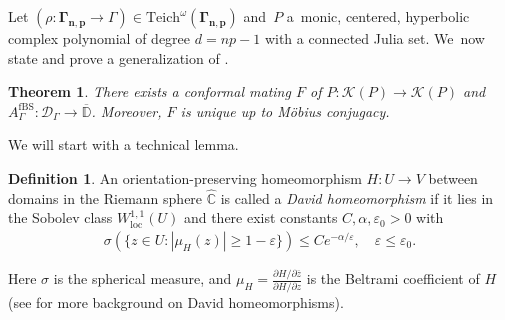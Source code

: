 \documentclass[10pt,a4paper]{amsart}
\newtheorem{theorem}[lemma]{Theorem}
\theoremstyle{definition}
\newtheorem{definition}[lemma]{Definition}
\theoremstyle{remark}
\newcommand{\C}{\mathbb{C}}
\newcommand{\D}{\mathbb{D}}
\begin{document}
Let $(\rho: \pmb{\Gamma_{n,p}}\to\Gamma)\in\mathrm{Teich}^\omega(\pmb{\Gamma_{n,p}})$ and~$P$ a~monic, centered, hyperbolic complex polynomial of degree $d=np-1$ with a connected Julia set. We~now state and prove a generalization of \cite[Th.\,3.6]{MM1}.


\begin{theorem}\label{conf_mat_thm}
There exists a conformal mating $F$ of $P:\mathcal{K}(P)\to\mathcal{K}(P)$ and $A_{\Gamma}^{\mathrm{fBS}}:\mathcal{D}_{\Gamma}\to \overline{\D}$. Moreover, $F$ is unique up to Möbius conjugacy.
\end{theorem}

We will start with a technical lemma.

\begin{definition}\label{david_def}
An orientation-preserving homeomorphism $H: U\to V$ between domains in the Riemann sphere $\widehat{\C}$ is called a \textit{David homeomorphism} if it lies in the Sobolev class $W^{1,1}_{\text{loc}}(U)$ and there exist constants $C,\alpha,\varepsilon_0>0$ with
\begin{align}\label{david_cond}
\sigma(\{z\in U: |\mu_H(z)|\geq 1-\varepsilon\}) \leq Ce^{-\alpha/\varepsilon}, \quad \varepsilon\leq \varepsilon_0.
\end{align}
\end{definition}
Here $\sigma$ is the spherical measure, and
$\mu_H= \frac{\partial H/ \partial\overline{z}}{\partial H/\partial z}$
is the Beltrami coefficient of $H$ (see \cite[Chap.\,20]{AIM09} for more background on David homeomorphisms).
\end{document}
